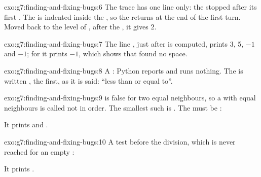 \begin{solution}{exo:g7:finding-and-fixing-bugs:6}
The trace has one line only: the  stopped after its first . The
 is indented inside the , so the  returns at the
end of the first turn. Moved back to the level of , after the ,
it gives 2.
\end{solution}

\begin{solution}{exo:g7:finding-and-fixing-bugs:7}
The line , just after  is computed,
prints 3, 5, $-1$ and $-1$; for  it prints $-1$, which shows that
 found no space.
\end{solution}

\begin{solution}{exo:g7:finding-and-fixing-bugs:8}
A : Python reports  and runs nothing. The
 is written \code{<=}, the \code{<} first, as it is said: ``less
than or equal to''.
\end{solution}

\begin{solution}{exo:g7:finding-and-fixing-bugs:9}
 is false for two equal neighbours, so a 
with equal neighbours is called not in order. The smallest such  is
\code{[1, 1]}. The  must be \code{<=}:

\label{lst:g7:finding-and-fixing-bugs:sol-is-sorted}

It prints  and .
\end{solution}

\begin{solution}{exo:g7:finding-and-fixing-bugs:10}
A test before the division, which is never reached for an empty :

\label{lst:g7:finding-and-fixing-bugs:sol-guard}

It prints .
\end{solution}

